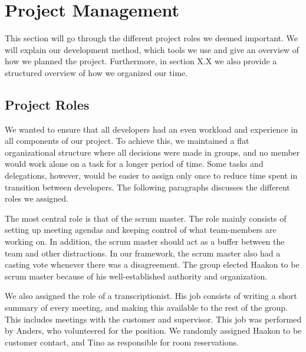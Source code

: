 \chapter{Project Management}
This section will go through the different project roles we deemed
important. We will explain our development method, which tools we use
and give an overview of how we planned the project. Furthermore, in
section X.X we also provide a structured overview of how we organized
our time. 

\section{Project Roles}
We wanted to ensure that all developers had an even workload and
experience in all components of our project. To achieve this, we
maintained a flat organizational structure where all decisions were
made in groups, and no member would work alone on a task for a longer
period of time. Some tasks and delegations, however, would be easier to
assign only once to reduce time spent in transition between developers.
The following paragraphs discusses the different roles we assigned.

The most central role is that of the scrum master. The role mainly
consists of setting up meeting agendas and keeping control of what
team-members are working on. In addition, the scrum master should act
as a buffer between the team and other distractions. In our framework,
the scrum master also had a casting vote whenever there was a
disagreement. The group elected Haakon to be scrum master because of
his well-established authority and organization.

We also assigned the role of a transcriptionist. His job consists of
writing a short summary of every meeting, and making this available to
the rest of the group. This includes meetings with the customer and
supervisor. This job was performed by Anders, who volunteered for the
position. We randomly assigned Haakon to be customer contact, and
Tino as responsible for room reservations.

